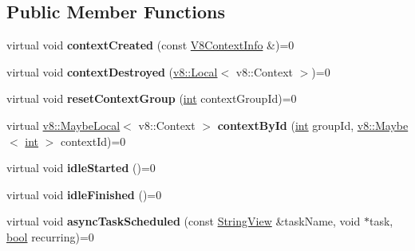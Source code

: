 \subsection*{Public Member Functions}
\begin{DoxyCompactItemize}
\item 
\mbox{\label{classv8__inspector_1_1V8Inspector_a2027babae023eb7745a699de30ef2040}} 
virtual void {\bfseries context\+Created} (const \mbox{\hyperlink{classv8__inspector_1_1V8ContextInfo}{V8\+Context\+Info}} \&)=0
\item 
\mbox{\label{classv8__inspector_1_1V8Inspector_a519c21ce7d4693e27c0b2859f3c5901d}} 
virtual void {\bfseries context\+Destroyed} (\mbox{\hyperlink{classv8_1_1Local}{v8\+::\+Local}}$<$ v8\+::\+Context $>$)=0
\item 
\mbox{\label{classv8__inspector_1_1V8Inspector_ab65e4ca3316c60644bfdefc52a769d99}} 
virtual void {\bfseries reset\+Context\+Group} (\mbox{\hyperlink{classint}{int}} context\+Group\+Id)=0
\item 
\mbox{\label{classv8__inspector_1_1V8Inspector_a79545a28609e5370dec7e244e7abc39f}} 
virtual \mbox{\hyperlink{classv8_1_1MaybeLocal}{v8\+::\+Maybe\+Local}}$<$ v8\+::\+Context $>$ {\bfseries context\+By\+Id} (\mbox{\hyperlink{classint}{int}} group\+Id, \mbox{\hyperlink{classv8_1_1Maybe}{v8\+::\+Maybe}}$<$ \mbox{\hyperlink{classint}{int}} $>$ context\+Id)=0
\item 
\mbox{\label{classv8__inspector_1_1V8Inspector_a923d7681b39db723a43b279a7429d9ea}} 
virtual void {\bfseries idle\+Started} ()=0
\item 
\mbox{\label{classv8__inspector_1_1V8Inspector_a679251f1e8f90799c45dde8a86c73a80}} 
virtual void {\bfseries idle\+Finished} ()=0
\item 
\mbox{\label{classv8__inspector_1_1V8Inspector_ab9d050ddc357b771b932af978e52aff3}} 
virtual void {\bfseries async\+Task\+Scheduled} (const \mbox{\hyperlink{classv8__inspector_1_1StringView}{String\+View}} \&task\+Name, void $\ast$task, \mbox{\hyperlink{classbool}{bool}} recurring)=0

\end{DoxyCompactItemize}
